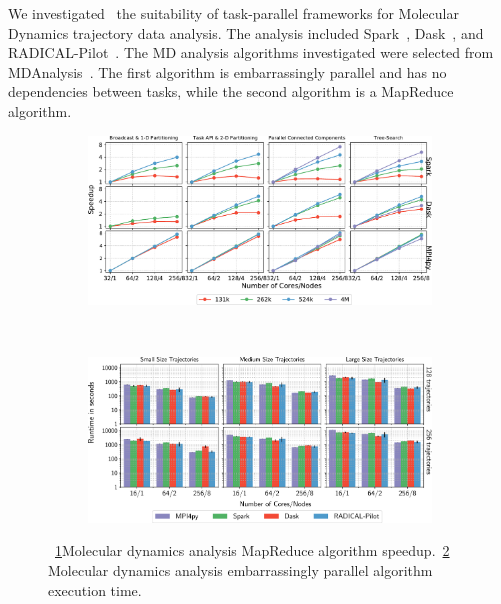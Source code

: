We investigated~\cite{paraskevakos2018task} the suitability of task-parallel frameworks for Molecular Dynamics trajectory data analysis. 
The analysis included Spark~\cite{zaharia2010spark}, Dask~\cite{rocklin2015dask}, and RADICAL-Pilot~\cite{merzky2019using}. 
The MD analysis algorithms investigated were selected from MDAnalysis~\cite{gowers2016mdanalysis,michaud2011mdanalysis}. 
The first algorithm is embarrassingly parallel and has no dependencies between tasks, while the second algorithm is a MapReduce algorithm.

\begin{figure}[t]
    \centering
    \begin{subfigure}[b]{0.45\textwidth}
        \includegraphics[width=.95\textwidth]{figures/All4approachesWith4MSpeedup.pdf}
        \caption{}
        \label{fig:leafletfinder}
    \end{subfigure}%
    ~ 
    \begin{subfigure}[b]{0.45\textwidth}
        \includegraphics[width=\linewidth]{figures/HausdorffSingleFig.pdf}
        \caption{}
        \label{fig:hausdorff}
    \end{subfigure}
    \caption{~\ref{fig:leafletfinder}Molecular dynamics analysis MapReduce algorithm speedup.~\ref{fig:hausdorff} Molecular dynamics analysis embarrassingly parallel algorithm execution time.}\label{fig:md_analysis}
\end{figure}

